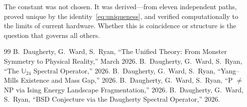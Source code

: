 \documentclass[11pt,a4paper]{article}
\theoremstyle{plain}
\theoremstyle{definition}
\theoremstyle{remark}
\begin{document}
The constant was not chosen. It was derived---from eleven independent paths, proved unique by the identity~\eqref{eq:uniqueness}, and verified computationally to the limits of current hardware. Whether this is coincidence or structure is the question that governs all others.

\begin{thebibliography}{99}
 B.~Daugherty, G.~Ward, S.~Ryan, ``The Unified Theory: From Monster Symmetry to Physical Reality,'' March 2026.
 B.~Daugherty, G.~Ward, S.~Ryan, ``The $\mathbb{U}_{24}$ Spectral Operator,'' 2026.
 B.~Daugherty, G.~Ward, S.~Ryan, ``Yang--Mills Existence and Mass Gap,'' 2026.
 B.~Daugherty, G.~Ward, S.~Ryan, ``P $\neq$ NP via Ising Energy Landscape Fragmentation,'' 2026.
 B.~Daugherty, G.~Ward, S.~Ryan, ``BSD Conjecture via the Daugherty Spectral Operator,'' 2026.
\end{thebibliography}
\end{document}
